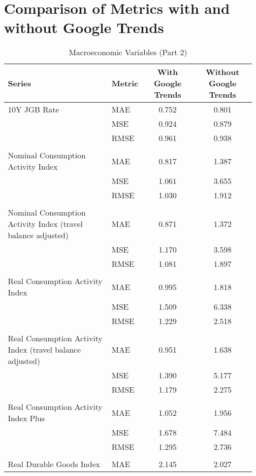 \documentclass[a4paper,12pt]{article}
\begin{document}
\section*{Comparison of Metrics with and without Google Trends}

\begin{table}
\caption{Macroeconomic Variables (Part 2)}
\label{tab:metrics_comparison_Macroeconomic_Variables_(Part_2)}
\begin{tabular}{llcc}
\toprule
Series & Metric & With Google Trends & Without Google Trends \\
\midrule
10Y JGB Rate & MAE & 0.752 & 0.801 \\
 & MSE & 0.924 & 0.879 \\
 & RMSE & 0.961 & 0.938 \\
\arrayrulecolor{black!30}\midrule &  &  &  \\
Nominal Consumption Activity Index & MAE & 0.817 & 1.387 \\
 & MSE & 1.061 & 3.655 \\
 & RMSE & 1.030 & 1.912 \\
\arrayrulecolor{black!30}\midrule &  &  &  \\
Nominal Consumption Activity Index (travel balance adjusted) & MAE & 0.871 & 1.372 \\
 & MSE & 1.170 & 3.598 \\
 & RMSE & 1.081 & 1.897 \\
\arrayrulecolor{black!30}\midrule &  &  &  \\
Real Consumption Activity Index & MAE & 0.995 & 1.818 \\
 & MSE & 1.509 & 6.338 \\
 & RMSE & 1.229 & 2.518 \\
\arrayrulecolor{black!30}\midrule &  &  &  \\
Real Consumption Activity Index (travel balance adjusted) & MAE & 0.951 & 1.638 \\
 & MSE & 1.390 & 5.177 \\
 & RMSE & 1.179 & 2.275 \\
\arrayrulecolor{black!30}\midrule &  &  &  \\
Real Consumption Activity Index Plus & MAE & 1.052 & 1.956 \\
 & MSE & 1.678 & 7.484 \\
 & RMSE & 1.295 & 2.736 \\
\arrayrulecolor{black!30}\midrule &  &  &  \\
Real Durable Goods Index & MAE & 2.145 & 2.027 \\

\end{tabular}
\end{table}
\end{document}
